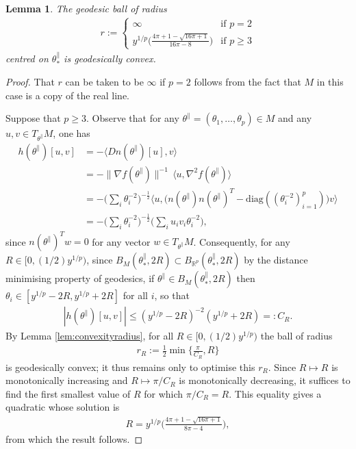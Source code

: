 \documentclass{article}
\newcommand{\RB}{\mathbb{R}}
\newcommand{\tpa}{\theta^{\parallel}}
\theoremstyle{plain}
\newtheorem{lemma}[theorem]{Lemma}
\theoremstyle{definition}
\theoremstyle{remark}
\begin{document}
\begin{lemma}\label{lem:exampleradius}
    The geodesic ball of radius
    \begin{align}
        r:=\begin{cases}
            \infty&\text{if $p=2$}\\y^{1/p}\bigg(\frac{4\pi+1-\sqrt{16\pi+1}}{16\pi-8}\bigg)&\text{if $p\geq 3$}
        \end{cases}
    \end{align}
    centred on $\tpa_*$ is geodesically convex.
\end{lemma}

\begin{proof}
    That $r$ can be taken to be $\infty$ if $p=2$ follows from the fact that $M$ in this case is a copy of the real line.

    Suppose that $p\geq 3$. Observe that for any $\tpa = (\theta_1,\dots,\theta_p)\in M$ and any $u,v\in T_{\tpa}M$, one has
    \begin{align}
        h(\tpa)[u,v] &= -\langle Dn(\tpa)[u],v\rangle\\&=-\|\nabla f(\tpa)\|^{-1}\,\langle u,\nabla^2f(\tpa)\rangle\\&=-\bigg(\sum_i\theta_i^{-2}\bigg)^{-\frac{1}{2}}\langle u,\big(n(\tpa)n(\tpa)^T-\text{diag}((\theta_i^{-2})_{i=1}^p)\big)v\rangle\\&=-\bigg(\sum_i\theta_i^{-2}\bigg)^{-\frac{1}{2}}\bigg(\sum_iu_iv_i\theta_i^{-2}\bigg),
    \end{align}
    since $n(\tpa)^Tw = 0$ for any vector $w\in T_{\tpa}M$. Consequently, for any $R\in [0,(1/2)y^{1/p})$, since $B_M(\tpa_*,2R)\subset B_{\RB^p}(\tpa_*,2R)$ by the distance minimising property of geodesics, if $\tpa\in B_M(\tpa_*,2R)$ then $\theta_i\in[y^{1/p}-2R,y^{1/p} + 2R]$ for all $i$, so that
    \begin{align}
        |h(\tpa)[u,v]|\leq (y^{1/p}-2R)^{-2}(y^{1/p}+2R)=:C_R.
    \end{align}
    By Lemma \ref{lem:convexityradius}, for all $R\in[0,(1/2)y^{1/p})$ the ball of radius
    \begin{align}
        r_R:=\frac{1}{2}\min\bigg\{\frac{\pi}{C_R},R\bigg\}
    \end{align}
    is geodesically convex; it thus remains only to optimise this $r_R$.  Since $R\mapsto R$ is monotonically increasing and $R\mapsto \pi/C_R$ is monotonically decreasing, it suffices to find the first smallest value of $R$ for which $\pi/C_R=R$. This equality gives a quadratic whose solution is
    \begin{align}
        R = y^{1/p}\bigg(\frac{4\pi+1-\sqrt{16\pi+1}}{8\pi-4}\bigg),
    \end{align}
    from which the result follows.
\end{proof}
\end{document}
